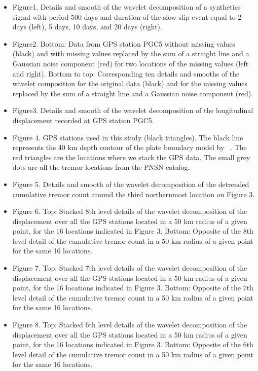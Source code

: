 \documentclass{article}
\begin{document}
\begin{itemize}

\item Figure1. Details and smooth of the wavelet decomposition of a synthetics signal with period 500 days and duration of the slow slip event equal to 2 days (left), 5 days, 10 days, and 20 days (right).

\item Figure2. Bottom: Data from GPS station PGC5 without missing values (black) and with missing values replaced by the sum of a straight line and a Gaussian noise component (red) for two locations of the missing values (left and right). Bottom to top: Corresponding ten details and smooths of the wavelet composition for the original data (black) and for the missing values replaced by the sum of a straight line and a Gaussian noise component (red).

\item Figure3. Details and smooth of the wavelet decomposition of the longitudinal displacement recorded at GPS station PGC5.

\item Figure 4. GPS stations used in this study (black triangles). The black line represents the 40 km depth contour of the plate boundary model by ~\citet{PRE_2003}. The red triangles are the locations where we stack the GPS data. The small grey dots are all the tremor locations from the PNSN catalog.

\item Figure 5. Details and smooth of the wavelet decomposition of the detrended cumulative tremor count around the third northernmost location on Figure 3.

\item Figure 6. Top: Stacked 8th level details of the wavelet decomposition of the displacement over all the GPS stations located in a 50 km radius of a given point, for the 16 locations indicated in Figure 3. Bottom: Opposite of the 8th level detail of the cumulative tremor count in a 50 km radius of a given point for the same 16 locations.

\item Figure 7. Top: Stacked 7th level details of the wavelet decomposition of the displacement over all the GPS stations located in a 50 km radius of a given point, for the 16 locations indicated in Figure 3. Bottom: Opposite of the 7th level detail of the cumulative tremor count in a 50 km radius of a given point for the same 16 locations.

\item Figure 8. Top: Stacked 6th level details of the wavelet decomposition of the displacement over all the GPS stations located in a 50 km radius of a given point, for the 16 locations indicated in Figure 3. Bottom: Opposite of the 6th level detail of the cumulative tremor count in a 50 km radius of a given point for the same 16 locations.


\end{itemize}
\end{document}
